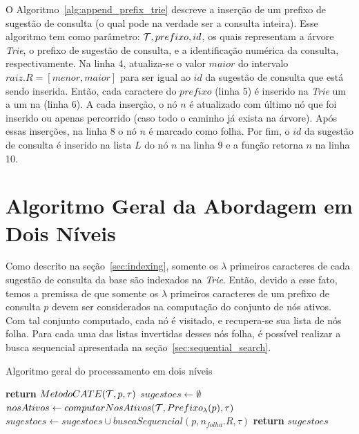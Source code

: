 O Algoritmo~\ref{alg:append_prefix_trie} descreve a inserção de um prefixo de sugestão de consulta (o qual pode na verdade ser a consulta inteira). Esse algoritmo tem como parâmetro: $\mathcal{T}, prefixo, id$, os quais representam a árvore \textit{Trie}, o prefixo de sugestão de consulta, e a identificação numérica da consulta, respectivamente. Na linha 4, atualiza-se o valor $maior$ do intervalo $raiz.R = [menor, maior]$ para ser igual ao $id$ da sugestão de consulta que está sendo inserida. Então, cada caractere do $prefixo$ (linha 5) é inserido na \textit{Trie} um a um na (linha 6). A cada inserção, o nó $n$ é atualizado com último nó que foi inserido ou apenas percorrido (caso todo o caminho já exista na árvore). Após essas inserções, na linha 8 o nó $n$ é marcado como folha. Por fim, o $id$ da sugestão de consulta é inserido na lista $L$ do nó $n$ na linha 9 e a função retorna $n$ na linha 10. 

\section{Algoritmo Geral da Abordagem em Dois Níveis}
\label{sec:general_two_level_algorithm}
Como descrito na seção~\ref{sec:indexing}, somente os $\lambda$ primeiros caracteres de cada sugestão de consulta da base são indexados na \textit{Trie}. Então, devido a esse fato, temos a premissa de que somente os $\lambda$ primeiros caracteres de um prefixo de consulta $p$ devem ser considerados na computação do conjunto de nós ativos. Com tal conjunto computado, cada nó é visitado, e recupera-se sua lista de nós folha. Para cada uma das listas invertidas desses nós folha, é possível realizar a busca sequencial apresentada na seção~\ref{sec:sequential_search}. 

\begin{algorithm}[H]
\caption{Algoritmo geral do processamento em dois níveis}\label{alg:general_two_level}
\begin{algorithmic}[1]
     \textbf{return} $MetodoCATE(\mathcal{T},p,\tau)$
    \EndIf
    \State $sugestoes \leftarrow \emptyset$
    \State $nosAtivos \leftarrow computarNosAtivos(\mathcal{T}, Prefixo_{\lambda}(p), \tau)$ 
     
            \State $sugestoes \leftarrow sugestoes \cup buscaSequencial(p, n_{folha}.R, \tau)$
        \EndFor
    \EndFor
    \State \textbf{return} $sugestoes$
\EndFunction
\end{algorithmic}
\end{algorithm}

